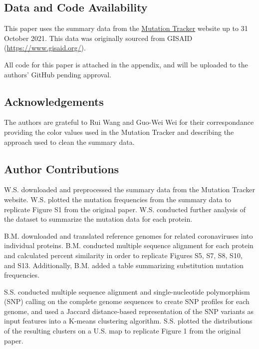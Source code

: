 \documentclass{article}
\begin{document}
\hypertarget{data-and-code-availability}{%
\subsection*{Data and Code
Availability}\label{data-and-code-availability}}

This paper uses the summary data from the
\href{https://users.math.msu.edu/users/weig/SARS-CoV-2_Mutation_Tracker.html}{Mutation
Tracker} website up to 31 October 2021. This data was originally sourced
from GISAID (\url{https://www.gisaid.org/}).

All code for this paper is attached in the appendix, and will be
uploaded to the authors' GitHub pending approval.

\hypertarget{acknowledgements}{%
\subsection*{Acknowledgements}\label{acknowledgements}}

The authors are grateful to Rui Wang and Guo-Wei Wei for their
correspondance providing the color values used in the Mutation Tracker
and describing the approach used to clean the summary data.

\hypertarget{author-contributions}{%
\subsection*{Author Contributions}\label{author-contributions}}

W.S. downloaded and preprocessed the summary data from the Mutation
Tracker website. W.S. plotted the mutation frequencies from the summary
data to replicate Figure S1 from the original paper. W.S. conducted
further analysis of the dataset to summarize the mutation data for each
protein.

B.M. downloaded and translated reference genomes for related
coronaviruses into individual proteins. B.M. conducted multiple sequence
alignment for each protein and calculated percent similarity in order to
replicate Figures S5, S7, S8, S10, and S13. Additionally, B.M. added a
table summarizing substitution mutation frequencies.

S.S. conducted multiple sequence alignment and single-nucleotide
polymorphism (SNP) calling on the complete genome sequences to create
SNP profiles for each genome, and used a Jaccard distance-based
representation of the SNP variants as input features into a K-means
clustering algorithm. S.S. plotted the distributions of the resulting
clusters on a U.S. map to replicate Figure 1 from the original paper.
\end{document}
